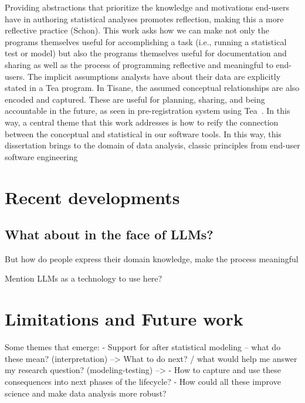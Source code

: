 Providing abstractions that prioritize the knowledge and motivations end-users
have in authoring statistical analyses promotes reflection, making this a more
reflective practice (Schon). This work asks how we can make not only the
programs themselves useful for accomplishing a task (i.e., running a statistical
test or model) but also the programs themselves useful for documentation and
sharing as well as the process of programming reflective and meaningful to
end-users. The implicit assumptions analysts have about their data are
explicitly stated in a Tea program. In Tisane, the assumed conceptual
relationships are also encoded and captured. These are useful for planning,
sharing, and being accountable in the future, as seen in pre-registration system
using Tea~\cite{rock}. In this way, a central theme that this work addresses is
how to reify the connection between the conceptual and statistical in our
software tools. In this way, this dissertation brings to the domain of data
analysis, classic principles from end-user software engineering


\section{Recent developments}
\subsection{What about in the face of LLMs?}

But how do people express their domain knowledge, make the process meaningful

Mention LLMs as a technology to use here?

\section{Limitations and Future work}
Some themes that emerge: 
- Support for after statistical modeling -- what do these mean? (interpretation) --> What to do next? / what would help me answer my research question? (modeling-testing) --> 
- How to capture and use these consequences into next phases of the lifecycle? 
- How could all these improve science and make data analysis more robust? 


